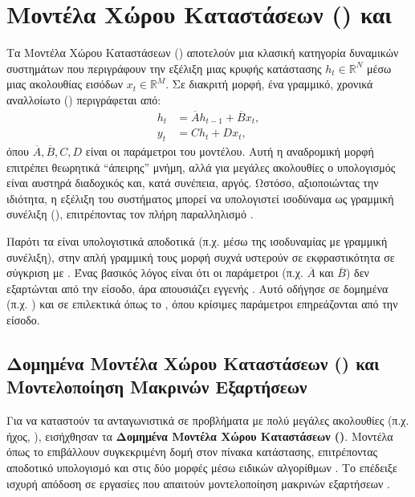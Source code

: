 \section{Μοντέλα Χώρου Καταστάσεων () και }
\label{sec:ssm_mamba}

Τα Μοντέλα Χώρου Καταστάσεων () αποτελούν μια 
κλασική κατηγορία δυναμικών συστημάτων που περιγράφουν την εξέλιξη μιας 
κρυφής κατάστασης $h_t \in \mathbb{R}^N$ μέσω μιας ακολουθίας εισόδων 
$x_t \in \mathbb{R}^M$. Σε διακριτή μορφή, ένα γραμμικό, χρονικά αναλλοίωτο 
()  περιγράφεται από:
\begin{align}
  \label{eq:ssm_recurrent}
h_{t} &= \overline{A} h_{t-1} + \overline{B} x_{t}, \\ 
y_{t} &= C h_{t} + D x_{t},
\end{align}
όπου $\overline{A}, \overline{B}, C, D$ είναι οι παράμετροι του μοντέλου. 
Αυτή η αναδρομική μορφή επιτρέπει θεωρητικά ``άπειρης'' μνήμη, 
αλλά για μεγάλες ακολουθίες ο υπολογισμός είναι αυστηρά διαδοχικός και, κατά 
συνέπεια, αργός. Ωστόσο, αξιοποιώντας την 
 ιδιότητα, η εξέλιξη του συστήματος μπορεί 
να υπολογιστεί ισοδύναμα ως γραμμική συνέλιξη (), 
επιτρέποντας τον πλήρη παραλληλισμό \cite{gu2021efficiently}.

Παρότι τα   είναι υπολογιστικά αποδοτικά (π.χ. μέσω της ισοδυναμίας
με γραμμ\-ική συνέλιξη), στην απλή γραμμ\-ική τους μορφή συχνά υστερούν σε εκφραστικότητα σε σύγκριση με
 \cite{gu2023mamba, gu2021efficiently}. Ένας βασικός λόγος είναι ότι οι παράμετροι
(π.χ. $\overline{A}$ και $\overline{B}$) δεν εξαρτώνται από την είσοδο, άρα απουσιάζει εγγενής 
 \cite{gu2023mamba}. Αυτό\- οδήγησε σε δομημένα  (π.χ. ) και σε επιλεκτικά  όπως το , όπου κρίσιμες παράμετροι επηρεάζονται από την είσοδο.

\subsection{Δομημένα Μοντέλα Χώρου Καταστάσεων () και Μοντελοποίηση Μακρινών Εξαρτήσεων}
Για να καταστούν τα  ανταγωνιστικά σε προβλήματα με πολύ μεγάλες ακολουθίες (π.χ. ήχος, ), εισήχθησαν τα \textbf{Δομημένα Μοντέλα Χώρου Καταστάσεων ()}. 
Μοντέλα όπως το \textbf{} επιβάλλουν συγκεκριμένη δομή στον πίνακα κατάστασης, επιτρέποντας αποδοτικό υπολογισμό και στις δύο μορφές μέσω ειδικών αλγορίθμων \cite{gu2021efficiently}. Το  επέδειξε ισχυρή απόδοση σε εργασίες που απαιτούν μοντελοποίηση μακρινών εξαρτήσεων \cite{gu2021efficiently,goel2022its}.

